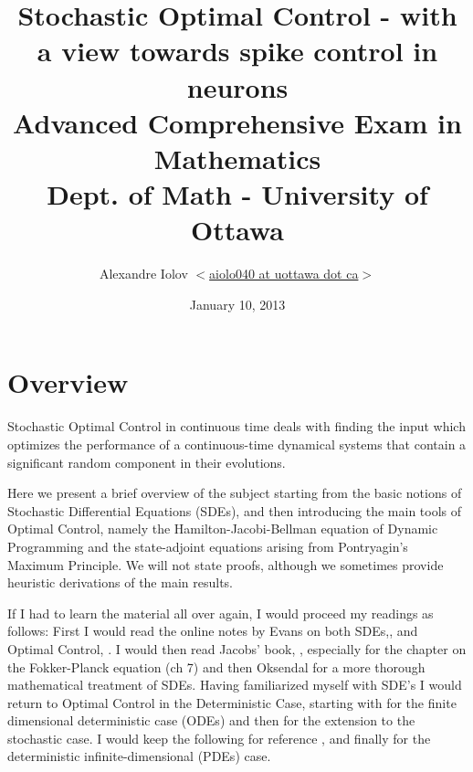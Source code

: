 \documentclass{article}
\begin{document}
\title{Stochastic Optimal Control - with a view towards spike control in neurons
\\
{\small Advanced Comprehensive Exam in Mathematics}
\\
{\small Dept. of Math - University of Ottawa}
}
\author{Alexandre Iolov 
$<$\href{mailto:aiolo040@uottawa.ca}
		{aiolo040 at uottawa dot ca}$>$}

\date{January 10, 2013}

\maketitle


\tableofcontents

\section{Overview}
Stochastic Optimal Control in continuous time deals with finding
the input which optimizes the performance of a continuous-time dynamical systems
that contain a significant random component in their evolutions.

Here we present a brief overview of the subject starting from the basic notions
of Stochastic Differential Equations (SDEs), 
and then introducing the main tools of Optimal Control, namely the
Hamilton-Jacobi-Bellman equation of Dynamic Programming and the state-adjoint
equations arising from Pontryagin's Maximum Principle. We will not state
proofs, although we sometimes provide heuristic derivations of the main
results.

If I had to learn the material all over again, I would proceed my readings as
follows: First I would read the online notes by Evans on both
SDEs,\cite{Evansa}, and Optimal Control, \cite{Evansb}. I would then read
Jacobs' book, \cite{Jacobs}, especially for the chapter on the Fokker-Planck
equation (ch 7) and then Oksendal \cite{Oksendal2007} for a
more thorough mathematical treatment of SDEs. Having familiarized myself with SDE's I would
return to Optimal Control in the Deterministic Case, starting with \cite{Kirk2004} for the
finite dimensional deterministic case (ODEs) and then \cite{Fleming1975} for the
extension to the stochastic case. I would keep the following for reference \cite{Krylov2008},
\cite{Hanson2007} and finally \cite{Fattorini1999} for the
deterministic infinite-dimensional (PDEs) case.
\end{document}
